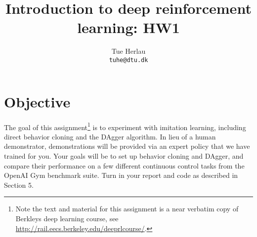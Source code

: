 \documentclass[12pt,twoside]{article}
\title{Introduction to deep reinforcement learning: HW1} %
\author{Tue Herlau\\ \texttt{tuhe@dtu.dk}} %
\begin{document}
\maketitle
\section{Objective} 
The goal of this assignment\footnote{Note the text and material for this assignment is a near verbatim copy of Berkleys deep learning course, see \url{http://rail.eecs.berkeley.edu/deeprlcourse/}. 
} is to experiment with imitation learning, including direct behavior cloning
and the DAgger algorithm. In lieu of a human demonstrator, demonstrations will be provided via an expert
policy that we have trained for you. Your goals will be to set up behavior cloning and DAgger, and compare
their performance on a few different continuous control tasks from the OpenAI Gym benchmark suite. Turn
in your report and code as described in Section 5.
\end{document}
